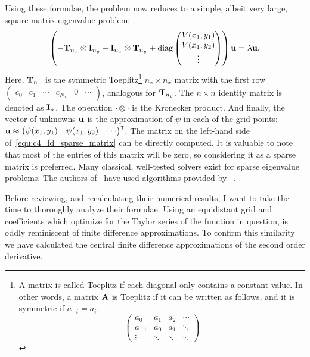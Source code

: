 Using these formulae, the problem now reduces to a simple, albeit very large, square matrix eigenvalue problem:
\begin{equation}\label{equ:c4_fd_sparse_matrix}
    \left(-\vb{T}_{n_x} \otimes \vb{I}_{n_y} - \vb{I}_{n_x} \otimes \vb{T}_{n_y} +  \operatorname{diag}\begin{pmatrix}V(x_1, y_1) \\ V(x_1, y_2) \\ \vdots \end{pmatrix} \right)\vb{u} = \lambda \vb{u}\text{.}
\end{equation}
Here, $\vb{T}_{n_x}$ is the symmetric Toeplitz\footnote{A matrix is called Toeplitz if each diagonal only contains a constant value. In other words, a matrix $\vb{A}$ is Toeplitz if it can be written as follows, and it is symmetric if $a_{-i} = a_i$. $$\begin{pmatrix} a_0 & a_1 & a_2 & \cdots \\ a_{-1} & a_0 & a_1 & \ddots \\ \vdots & \ddots & \ddots & \ddots \end{pmatrix}$$} $n_x \times n_x$ matrix with the first row $\begin{pmatrix} c_0 & c_1 & \cdots & c_{N_x} & 0 & \cdots \end{pmatrix}$, analogous for $\vb{T}_{n_y}$. The $n\times n$ identity matrix is denoted as $\vb{I}_n$. The operation $\cdot \otimes \cdot$ is the Kronecker product. And finally, the vector of unknowns $\vb{u}$ is the approximation of $\psi$ in each of the grid points: $\vb{u} \approx {\begin{pmatrix} \psi(x_1, y_1) & \psi(x_1, y_2) & \cdots \end{pmatrix}}^\intercal$. The matrix on the left-hand side of~\eqref{equ:c4_fd_sparse_matrix} can be directly computed. It is valuable to note that most of the entries of this matrix will be zero, so considering it as a sparse matrix is preferred. Many classical, well-tested solvers exist for sparse eigenvalue problems. The authors of~\cite{wang_new_2009} have used algorithms provided by \mathematica{}~\cite{Mathematica}.

Before reviewing, and recalculating their numerical results, I want to take the time to thoroughly analyze their formulae. Using an equidistant grid and coefficients which optimize for the Taylor series of the function in question, is oddly reminiscent of finite difference approximations. To confirm this similarity we have calculated the central finite difference approximations of the second order derivative.

